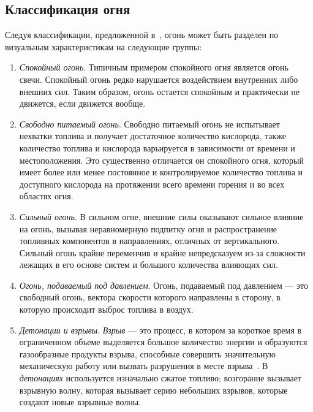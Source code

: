 \subsection{Классификация огня}

Следуя классификации, предложенной в~\cite{nielsen}, огонь может быть разделен
по визуальным характеристикам на следующие группы:
\begin{enumerate}
    \item \emph{Спокойный огонь}. Типичным примером спокойного огня
        является \break{} огонь свечи. Спокойный огонь редко нарушается
        воздействием внутренних либо внешних сил. Таким образом, огонь остается
        спокойным и практически не движется, если движется вообще.

    \item \emph{Свободно питаемый огонь}. Свободно питаемый огонь не
        испытывает нехватки топлива и получает достаточное количество кислорода,
        также количество топлива и кислорода варьируется в зависимости от
        времени и местоположения. Это существенно отличается он спокойного огня,
        который имеет более или менее постоянное и контролируемое количество
        топлива и доступного кислорода на протяжении всего времени горения и во
        всех областях огня.

    \item \emph{Сильный огонь}. В сильном огне, внешние силы оказывают сильное
        влияние на огонь, вызывая неравномерную подпитку огня и распространение
        топливных компонентов в направлениях, отличных от вертикального. Сильный
        огонь крайне переменчив и крайне непредсказуем из-за сложности лежащих в
        его основе систем и большого количества влияющих сил.

    \item \emph{Огонь, подаваемый под давлением}. Огонь, подаваемый под
        давлением --- это свободный огонь, вектора скорости которого направлены
        в сторону, в которую происходит выброс топлива в воздух.

    \item \emph{Детонации и взрывы}. \emph{Взрыв} — это процесс, в котором за
        короткое время в ограниченном объеме выделяется большое количество
        энергии и образуются газообразные продукты взрыва, способные совершить
        значительную механическую работу или вызвать разрушения в месте
        взрыва~\cite{WikiDetonation}. В \emph{детонациях} используется изначально
        сжатое топливо; возгорание вызывает взрывную волну, которая вызывает
        серию небольших взрывов, которые создают новые взрывные волны.
\end{enumerate}

